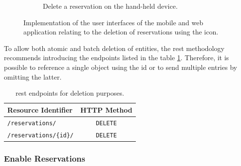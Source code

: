 \begin{figure}[h]
\begin{subfigure}[c]{0.3\textwidth}
         \caption{Delete a reservation on the hand-held device.}
         \label{fig:mobile-delete-reservation-impl}
    \end{subfigure}
    \caption{Implementation of the user interfaces of the mobile and web application relating to the deletion of reservations using the  icon.}
    \label{fig:impl-delete-reservation}
\end{figure}

\noindent To allow both atomic and batch deletion of entities, the \acrshort{rest} methodology recommends introducing the endpoints listed in the table \ref{tab:delete-reservation-rest}. Therefore, it is possible to reference a single object using the \acrshort{id} or to send multiple entries by omitting the latter.

\begingroup
\setlength{\tabcolsep}{10pt} %
\renewcommand{\arraystretch}{1.5} %
\begin{table}[h]
\centering
\caption{\acrshort{rest} endpoints for deletion purposes.}
    \begin{tabular}{l|c}
    Resource Identifier & HTTP Method \\ \hline
    \texttt{/reservations/} & \texttt{DELETE} \\
    \texttt{/reservations/\{id\}/} & \texttt{DELETE}
    \end{tabular}
\label{tab:delete-reservation-rest}
\end{table}
\endgroup

\newpage

\subsubsection{Enable Reservations}
\label{ch:Implementation:sec:Reservation System:ssec:Management Capabilities:sssec:Enable Reservations}

